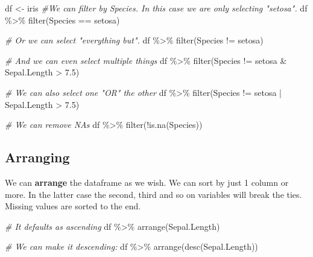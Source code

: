 \documentclass[
]{book}
\newenvironment{Shaded}{\begin{snugshade}}{\end{snugshade}}
\newcommand{\CommentTok}[1]{\textcolor[rgb]{0.56,0.35,0.01}{\textit{#1}}}
\newcommand{\FloatTok}[1]{\textcolor[rgb]{0.00,0.00,0.81}{#1}}
\newcommand{\FunctionTok}[1]{\textcolor[rgb]{0.00,0.00,0.00}{#1}}
\newcommand{\NormalTok}[1]{#1}
\newcommand{\OtherTok}[1]{\textcolor[rgb]{0.56,0.35,0.01}{#1}}
\newcommand{\SpecialCharTok}[1]{\textcolor[rgb]{0.00,0.00,0.00}{#1}}
\newcommand{\StringTok}[1]{\textcolor[rgb]{0.31,0.60,0.02}{#1}}
\begin{document}
\begin{Shaded}
\begin{Highlighting}[]
\NormalTok{df }\OtherTok{\textless{}{-}}\NormalTok{ iris}
\CommentTok{\#We can filter by Species. In this case we are only selecting "setosa".}
\NormalTok{df }\SpecialCharTok{\%\textgreater{}\%} 
  \FunctionTok{filter}\NormalTok{(Species }\SpecialCharTok{==} \StringTok{\textquotesingle{}setosa\textquotesingle{}}\NormalTok{)}

\CommentTok{\# Or we can select "everything but".}
\NormalTok{df }\SpecialCharTok{\%\textgreater{}\%} 
  \FunctionTok{filter}\NormalTok{(Species }\SpecialCharTok{!=} \StringTok{\textquotesingle{}setosa\textquotesingle{}}\NormalTok{)}

\CommentTok{\# And we can even select multiple things}
\NormalTok{df }\SpecialCharTok{\%\textgreater{}\%} 
  \FunctionTok{filter}\NormalTok{(Species }\SpecialCharTok{!=} \StringTok{\textquotesingle{}setosa\textquotesingle{}} \SpecialCharTok{\&}\NormalTok{ Sepal.Length }\SpecialCharTok{\textgreater{}} \FloatTok{7.5}\NormalTok{)}

\CommentTok{\# We can also select one "OR" the other}
\NormalTok{df }\SpecialCharTok{\%\textgreater{}\%} 
  \FunctionTok{filter}\NormalTok{(Species }\SpecialCharTok{!=} \StringTok{\textquotesingle{}setosa\textquotesingle{}} \SpecialCharTok{|}\NormalTok{ Sepal.Length }\SpecialCharTok{\textgreater{}} \FloatTok{7.5}\NormalTok{)}

\CommentTok{\# We can remove NAs}
\NormalTok{df }\SpecialCharTok{\%\textgreater{}\%} 
  \FunctionTok{filter}\NormalTok{(}\SpecialCharTok{!}\FunctionTok{is.na}\NormalTok{(Species))}
\end{Highlighting}
\end{Shaded}

\hypertarget{arranging}{%
\subsection{Arranging}\label{arranging}}

We can \textbf{arrange} the dataframe as we wish.
We can sort by just 1 column or more.
In the latter case the second, third and so on variables will break the ties.
Missing values are sorted to the end.

\begin{Shaded}
\begin{Highlighting}[]
\CommentTok{\# It defaults as ascending}
\NormalTok{df }\SpecialCharTok{\%\textgreater{}\%} 
  \FunctionTok{arrange}\NormalTok{(Sepal.Length)}

\CommentTok{\# We can make it descending:}
\NormalTok{df }\SpecialCharTok{\%\textgreater{}\%} 
  \FunctionTok{arrange}\NormalTok{(}\FunctionTok{desc}\NormalTok{(Sepal.Length))}
\end{Highlighting}
\end{Shaded}
\end{document}
